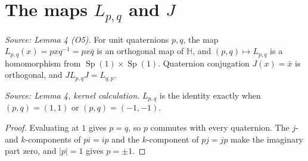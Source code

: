 \section{The maps \texorpdfstring{\(L_{p,q}\)}{L(p,q)} and \texorpdfstring{\(J\)}{J}}

\begin{definition}[\(L_{p,q}\) and \(J\)]
  \label{def:lpq}
  \leanok
  \textit{Source: Lemma 4 (O5).}
  For unit quaternions \(p,q\), the map \(L_{p,q}(x)=pxq^{-1}=px\bar q\) is
  an orthogonal map of \(\mathbb H\), and \((p,q)\mapsto L_{p,q}\) is a
  homomorphism from \(\operatorname{Sp}(1)\times\operatorname{Sp}(1)\).
  Quaternion conjugation \(J(x)=\bar x\) is orthogonal, and
  \(JL_{p,q}J=L_{q,p}\).
\end{definition}

\begin{lemma}
  \label{lem:lpq-kernel}
  \leanok
  \textit{Source: Lemma 4, kernel calculation.}
  \(L_{p,q}\) is the identity exactly when \((p,q)=(1,1)\) or
  \((p,q)=(-1,-1)\).
\end{lemma}
\begin{proof}
  \leanok
  Evaluating at \(1\) gives \(p=q\), so \(p\) commutes with every
  quaternion. The \(j\)- and \(k\)-components of \(pi=ip\) and the
  \(k\)-component of \(pj=jp\) make the imaginary part zero, and
  \(|p|=1\) gives \(p=\pm1\).
\end{proof}

